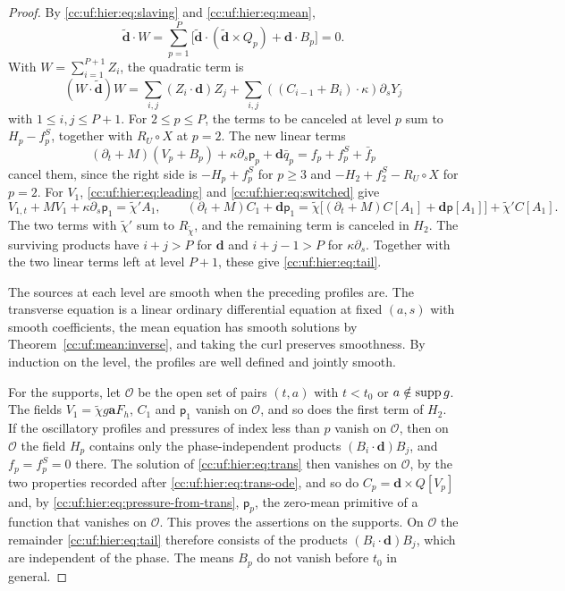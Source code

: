 \begin{proof}
By \eqref{cc:uf:hier:eq:slaving} and \eqref{cc:uf:hier:eq:mean},
\[
 \widetilde{\mathbf d}\cdot W
 =\sum_{p=1}^P\bigl[\widetilde{\mathbf d}\cdot
   (\widetilde{\mathbf d}\times Q_p)+\mathbf d\cdot B_p\bigr]=0.
\]
With $W=\sum_{i=1}^{P+1}Z_i$, the quadratic term is
\[
 (W\cdot\widetilde{\mathbf d})W
 =\sum_{i,j}(Z_i\cdot\mathbf d)Z_j
  +\sum_{i,j}((C_{i-1}+B_i)\cdot\kappa)\partial_sY_j
\]
with $1\le i,j\le P+1$. For $2\le p\le P$, the terms to be
canceled at level $p$ sum to $H_p-f_p^S$, together with $R_U\circ X$
at $p=2$. The new linear terms
\[
 (\partial_t+M)(V_p+B_p)+\kappa\partial_s\mathsf p_p
    +\mathbf d\bar q_p=f_p+f_p^S+\bar f_p
\]
cancel them, since the right side is $-H_p+f_p^S$ for $p\ge3$ and
$-H_2+f_2^S-R_U\circ X$ for $p=2$. For $V_1$, \eqref{cc:uf:hier:eq:leading}
and \eqref{cc:uf:hier:eq:switched} give
\[
 V_{1,t}+MV_1+\kappa\partial_s\mathsf p_1=\widetilde\chi'A_1,\qquad
 (\partial_t+M)C_1+\mathbf d\mathsf p_1
 =\widetilde\chi\bigl[(\partial_t+M)C[A_1]+\mathbf d\mathsf p[A_1]\bigr]
  +\widetilde\chi'C[A_1].
\]
The two terms with $\widetilde\chi'$ sum to $R_{\widetilde\chi}$, and the
remaining term is canceled in $H_2$. The surviving
products have $i+j>P$ for $\mathbf d$ and $i+j-1>P$ for
$\kappa\partial_s$. Together with the two linear terms left at
level $P+1$, these give \eqref{cc:uf:hier:eq:tail}.

The sources at each level are smooth when the preceding profiles are.
The transverse equation is a linear ordinary differential equation at
fixed $(a,s)$ with smooth coefficients, the mean equation has smooth
solutions by Theorem~\ref{cc:uf:mean:inverse}, and taking the curl
preserves smoothness. By induction on the level, the profiles are well
defined and jointly smooth.

For the supports, let $\mathcal O$ be the open set of pairs $(t,a)$ with
$t<t_0$ or $a\notin\operatorname{supp} g$. The fields
$V_1=\widetilde\chi g\mathbf a F_h$, $C_1$ and $\mathsf p_1$ vanish on
$\mathcal O$, and so does the first term of $H_2$. If the oscillatory
profiles and pressures of index less than $p$ vanish on $\mathcal O$, then
on $\mathcal O$ the field $H_p$ contains only the phase-independent
products $(B_i\cdot\mathbf d)B_j$, and $f_p=f_p^S=0$ there. The solution
of \eqref{cc:uf:hier:eq:trans} then vanishes on $\mathcal O$, by the two
properties recorded after \eqref{cc:uf:hier:eq:trans-ode}, and so do
$C_p=\mathbf d\times Q[V_p]$ and, by
\eqref{cc:uf:hier:eq:pressure-from-trans}, $\mathsf p_p$, the zero-mean
primitive of a function that vanishes on $\mathcal O$. This proves the
assertions on the supports. On $\mathcal O$ the remainder \eqref{cc:uf:hier:eq:tail}
therefore consists of the products $(B_i\cdot\mathbf d)B_j$, which are
independent of the phase. The means $B_p$ do not vanish before $t_0$
in general.
\end{proof}

